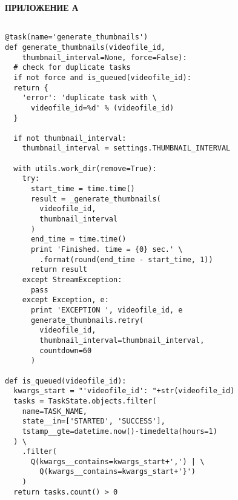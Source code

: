 \begin{flushright}
  \fontsize{19}{0}\textbf{ПРИЛОЖЕНИЕ А}
\end{flushright}



\begin{lstlisting}[caption={Образец реализации задачи по генерации скриншотов из видео}, label=lst:thumbnails]

@task(name='generate_thumbnails')
def generate_thumbnails(videofile_id,
    thumbnail_interval=None, force=False):
  # check for duplicate tasks
  if not force and is_queued(videofile_id):
  return {
    'error': 'duplicate task with \
      videofile_id=%d' % (videofile_id)
  }

  if not thumbnail_interval:
    thumbnail_interval = settings.THUMBNAIL_INTERVAL

  with utils.work_dir(remove=True):
    try:
      start_time = time.time()
      result = _generate_thumbnails(
        videofile_id,
        thumbnail_interval
      )
      end_time = time.time()
      print 'Finished. time = {0} sec.' \
        .format(round(end_time - start_time, 1))
      return result
    except StreamException:
      pass
    except Exception, e:
      print 'EXCEPTION ', videofile_id, e
      generate_thumbnails.retry(
        videofile_id,
        thumbnail_interval=thumbnail_interval,
        countdown=60
      )

def is_queued(videofile_id):
  kwargs_start = "'videofile_id': "+str(videofile_id)
  tasks = TaskState.objects.filter(
    name=TASK_NAME,
    state__in=['STARTED', 'SUCCESS'],
    tstamp__gte=datetime.now()-timedelta(hours=1)
  ) \
    .filter(
      Q(kwargs__contains=kwargs_start+',') | \
        Q(kwargs__contains=kwargs_start+'}')
    )
  return tasks.count() > 0
\end{lstlisting}
